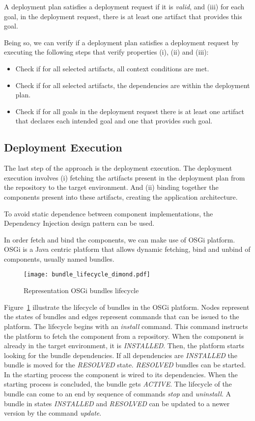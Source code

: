 A deployment plan satisfies a deployment request if it is \emph{valid}, and (iii) for each goal, in the deployment request, there is at least one artifact that provides this goal.

Being so, we can verify if a deployment plan satisfies a deployment request by executing the following steps that verify properties (i), (ii) and (iii):

\begin{itemize}
  \item Check if for all selected artifacts, all context conditions are met.
  \item Check if for all selected artifacts, the dependencies are within the deployment plan.
  \item Check if for all goals in the deployment request there is at least one artifact that declares each intended goal and one that provides such goal.
\end{itemize}

\subsection{Deployment Execution}

The last step of the approach is the deployment execution. The deployment execution involves (i) fetching the artifacts present in the deployment plan from the repository to the target environment. And (ii) binding together the components present into these artifacts, creating the application architecture.

To avoid static dependence between component implementations, the Dependency Injection\cite{fowler_inversion_2004} design pattern can be used.

In order fetch and bind the components, we can make use of OSGi platform\cite{the_osgi_alliance_osgi_2007}. OSGi is a Java centric platform that allows dynamic fetching, bind and unbind of components, usually named bundles.

\begin{figure}[!htb]
  \centering
  \texttt{[image: bundle\_lifecycle\_dimond.pdf]}
  \caption{Representation OSGi bundles lifecycle}
  \label{fig:osgi_bundles}
\end{figure}

Figure~\ref{fig:osgi_bundles} illustrate the lifecycle of bundles in the OSGi platform\cite{the_osgi_alliance_osgi_2007}. Nodes represent the states of bundles and edges represent commands that can be issued to the platform.
The lifecycle begins with an \emph{install} command. This command instructs the platform to fetch the component from a repository. When the component is already in the target environment, it is \emph{INSTALLED}. Then, the platform starts looking for the bundle dependencies. If all dependencies are \emph{INSTALLED} the bundle is moved for the \emph{RESOLVED} state. \emph{RESOLVED} bundles can be started. In the starting process the component is wired to its dependencies. When the starting process is concluded, the bundle gets \emph{ACTIVE}. The lifecycle of the bundle can come to an end by sequence of commands \emph{stop} and \emph{uninstall}. A bundle in states \emph{INSTALLED} and \emph{RESOLVED} can be updated to a newer version by the command \emph{update}.
